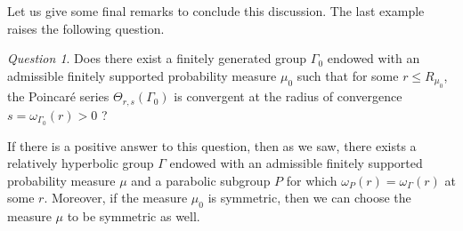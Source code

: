 \documentclass{amsart}
\newcommand{\showcomments}{yes}
\newenvironment{comment}%
{\ifthenelse{\equal{\showcomments}{yes}}%
{\footnotemark
    \begin{lrbox}{\commentbox}
    \begin{minipage}[t]{1.25in}\raggedright\sffamily\upshape\tiny
    \footnotemark[\arabic{footnote}]}%
{\begin{lrbox}{\commentbox}}}%
{\ifthenelse{\equal{\showcomments}{yes}}%
{\end{minipage}\end{lrbox}\marginpar{\usebox{\commentbox}}}%
{\end{lrbox}}}
\theoremstyle{definition}
\theoremstyle{remark}
\newtheorem{quest}[thm]{Question}
\begin{document}


Let us give some final remarks to conclude this discussion.
The last example raises the following question.
\begin{quest}\label{question}
Does there exist a finitely generated group $\Gamma_0$ endowed with an admissible finitely supported probability measure $\mu_0$ such that for some $r\leq R_{\mu_0}$, the Poincaré series $\Theta_{r,s}(\Gamma_0)$ is convergent at the radius of convergence $s=\omega_{\Gamma_0}(r)>0$ ?
\end{quest}

If there is a positive answer to this question, then as we saw, there exists a relatively hyperbolic group $\Gamma$ endowed with an admissible finitely supported probability measure $\mu$ and a parabolic subgroup $P$ for which $\omega_P(r)=\omega_\Gamma(r)$ at some $r$.
Moreover, if the measure $\mu_0$ is symmetric, then we can choose the measure $\mu$ to be symmetric as well.
\end{document}
